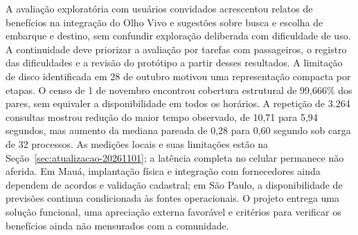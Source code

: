 \documentclass[12pt,oneside,a4paper,brazil,chapter=TITLE]{abntex2}
\begin{document}
A avaliação exploratória com usuários convidados acrescentou relatos de benefícios na integração do Olho Vivo e sugestões sobre busca e escolha de embarque e destino, sem confundir exploração deliberada com dificuldade de uso. A continuidade deve priorizar a avaliação por tarefas com passageiros, o registro das dificuldades e a revisão do protótipo a partir desses resultados. A limitação de disco identificada em 28 de outubro motivou uma representação compacta por etapas. O censo de 1 de novembro encontrou cobertura estrutural de 99,666\% dos pares, sem equivaler a disponibilidade em todos os horários. A repetição de 3.264 consultas mostrou redução do maior tempo observado, de 10,71 para 5,94 segundos, mas aumento da mediana pareada de 0,28 para 0,60 segundo sob carga de 32 processos. As medições locais e suas limitações estão na Seção~\ref{sec:atualizacao-20261101}; a latência completa no celular permanece não aferida. Em Mauá, implantação física e integração com fornecedores ainda dependem de acordos e validação cadastral; em São Paulo, a disponibilidade de previsões continua condicionada às fontes operacionais. O projeto entrega uma solução funcional, uma apreciação externa favorável e critérios para verificar os benefícios ainda não mensurados com a comunidade.
\end{document}
